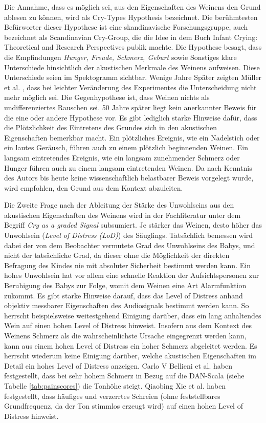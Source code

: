 Die Annahme, dass es möglich sei, aus den Eigenschaften des Weinens den Grund ablesen zu können, wird als \glqq Cry-Types Hypothesis\grqq{} bezeichnet. Die berühmtesten Befürworter dieser Hypothese ist eine skandinavische Forschungsgruppe, auch bezeichnet als \glqq Scandinavian Cry-Group\grqq , die die Idee in dem Buch \glqq Infant Crying: Theoretical and Research Perspectives\grqq \cite{crygroup} publik machte. Die Hypothese besagt, dass die Empfindungen \emph{Hunger, Freude, Schmerz, Geburt} sowie {Sonstiges} klare Unterschiede hinsichtlich der akustischen Merkmale des Weinens aufweisen. Diese Unterschiede seien im Spektogramm sichtbar. Wenige Jahre Später zeigten Müller et al. \cite{cryisnoise}, dass bei leichter Veränderung des Experimentes die Unterscheidung nicht mehr möglich sei. Die Gegenhypothese ist, dass Weinen \glqq nichts als undifferenziertes Rauschen\grqq{} sei. 50 Jahre später liegt kein anerkannter Beweis für die eine oder andere Hypothese vor. Es gibt lediglich starke Hinweise dafür, dass die Plötzlichkeit des Eintretens des Grundes sich in den akustischen Eigenschaften bemerkbar macht. Ein plötzliches Ereignis, wie ein Nadelstich oder ein lautes Geräusch, führen auch zu einem plötzlich beginnenden Weinen. Ein langsam eintretendes Ereignis, wie ein langsam zunehmender Schmerz oder Hunger führen auch zu einem langsam eintretenden Weinen. Da nach Kenntnis des Autors bis heute keine wissenschaftlich belastbarer Beweis vorgelegt wurde, wird empfohlen, den Grund aus dem Kontext abzuleiten.\cite[S. 9 - 13, 17 - 19]{signal}

Die Zweite Frage nach der Ableitung der Stärke des Unwohlseins aus den akustischen Eigenschaften des Weinens wird in der Fachliteratur unter dem Begriff \emph{Cry as a graded Signal} subsumiert. Je \glqq stärker\grqq{} das Weinen, desto höher das Unwohlsein (\emph{Level of Distress (LoD)}) des Säuglings. Tatsächlich bemessen wird dabei der von dem Beobachter vermutete Grad des Unwohlseins des Babys, und nicht der tatsächliche Grad, da dieser ohne die Möglichkeit der direkten Befragung des Kindes nie mit absoluter Sicherheit bestimmt werden kann. Ein hohes Unwohlsein hat vor allem eine schnelle Reaktion der Aufsichtspersonen zur Beruhigung des Babys zur Folge, womit dem Weinen eine Art Alarmfunktion zukommt. Es gibt starke Hinweise darauf, dass das Level of Distress anhand objektiv messbarer Eigenschaften des Audiosignals bestimmt werden kann. So herrscht beispielsweise weitestgehend Einigung darüber, dass ein \glqq lang\grqq{} anhaltendes Wein auf einen hohen Level of Distress hinweist. Insofern aus dem Kontext des Weinens Schmerz als die wahrscheinlichste Ursache eingegrenzt werden kann, kann aus einem hohen Level of Distress ein hoher Schmerz abgeleitet werden. \cite[S. 13 - 17]{signal} \cite{lod} Es herrscht wiederum keine Einigung darüber, welche akustischen Eigenschaften im Detail ein hohes Level of Distress anzeigen. Carlo V Bellieni et al. \cite{dan} haben festgestellt, dass bei sehr hohem Schmerz in Bezug auf die DAN-Scala (siehe Tabelle \ref{tab:painscores}) die Tonhöhe steigt. Qiaobing Xie et al. \cite{lod} haben festgestellt, dass häufiges und \glqq verzerrtes\grqq{} Schreien (ohne feststellbares Grundfrequenz, da der Ton stimmlos erzeugt wird)  auf einen hohen Level of Distress hinweist.

